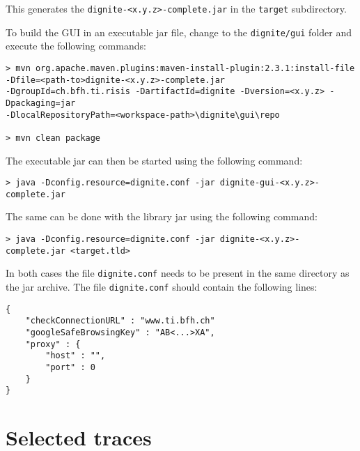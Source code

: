 \documentclass[
	a4paper,					10pt,							twoside,					openright,				notitlepage,			parskip=half,			]{scrreprt}
\begin{document}
This generates the \verb|dignite-<x.y.z>-complete.jar| in the \verb|target| subdirectory.

To build the \gls{GUI} in an executable jar file, change to the \verb|dignite/gui| folder
and execute the following commands:

\begin{lstlisting}[language={},keywords={},identifierstyle=\ttfamily,keywordstyle=\ttfamily]
> mvn org.apache.maven.plugins:maven-install-plugin:2.3.1:install-file 
-Dfile=<path-to>dignite-<x.y.z>-complete.jar 
-DgroupId=ch.bfh.ti.risis -DartifactId=dignite -Dversion=<x.y.z> -Dpackaging=jar 
-DlocalRepositoryPath=<workspace-path>\dignite\gui\repo

> mvn clean package
\end{lstlisting}

\newpage

The executable jar can then be started using the following command:
\begin{lstlisting}[language={},keywords={},identifierstyle=\ttfamily,keywordstyle=\ttfamily]
> java -Dconfig.resource=dignite.conf -jar dignite-gui-<x.y.z>-complete.jar
\end{lstlisting}

The same can be done with the library jar using the following command:
\begin{lstlisting}[language={},keywords={},identifierstyle=\ttfamily,keywordstyle=\ttfamily]
> java -Dconfig.resource=dignite.conf -jar dignite-<x.y.z>-complete.jar <target.tld>
\end{lstlisting}

In both cases the file \verb|dignite.conf| needs to be present in the same directory as the jar archive.
The file \verb|dignite.conf| should contain the following lines:
\begin{lstlisting}[language={},keywords={},identifierstyle=\ttfamily,keywordstyle=\ttfamily]
{
    "checkConnectionURL" : "www.ti.bfh.ch"
    "googleSafeBrowsingKey" : "AB<...>XA",
    "proxy" : {
        "host" : "",
        "port" : 0
    }
}
\end{lstlisting}\clearpage{}
\clearpage{}\chapter{Selected traces} 
\label{chap:seltraces}
\end{document}
